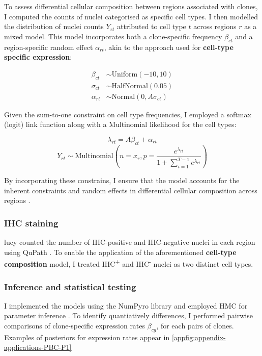 To assess differential cellular composition between regions associated with clones, I computed the counts of nuclei categorised as specific cell types. I then modelled the distribution of nuclei counts $Y_{rt}$ attributed to cell type $t$ across regions $r$ as a mixed model. This model incorporates both a clone-specific frequency $\beta_{ct}$ and a region-specific random effect $\alpha_{rt}$, akin to the approach used for \textbf{cell-type specific expression}:

\begin{align}
\beta_{ct} &\sim \text{Uniform}(-10, 10) \\
\sigma_{ct} &\sim \text{HalfNormal}(0.05) \\
\alpha_{rt} &\sim \text{Normal}(0, A\sigma_{ct})
\end{align}

Given the sum-to-one constraint on cell type frequencies, I employed a softmax (logit) link function along with a Multinomial likelihood for the cell types:

\begin{equation}
\lambda_{rt} = A\beta_{ct} + \alpha_{rt}
\end{equation}
\begin{equation}
Y_{rt} \sim \text{Multinomial}\left(n=x_r, p=\frac{e^{\lambda_{rt}}}{1 + \sum_{i=1}^{T-1} e^{\lambda_{rt}}}\right)
\end{equation}

By incorporating these constrains, I ensure that the model accounts for the inherent constraints and random effects in differential cellular composition across regions .

\subsubsection*{IHC staining}
\ac{lucy} counted the number of IHC-positive and IHC-negative nuclei in each region using QuPath \parencite{Bankhead2017-px}. To enable the application of the aforementioned \textbf{cell-type composition} model, I treated IHC\textsuperscript{+} and IHC\textsuperscript{-} nuclei as two distinct cell types.

\subsubsection*{Inference and statistical testing}

I implemented the models using the \ac{NumPyro} library and employed \acf{HMC} for parameter inference . To identify quantiatively differences, I performed pairwise comparisons of clone-specific expression rates $\beta_{cg}$, for each pairs of clones. Examples of posteriors for expression rates appear in \cref{appfig:appendix-applications-PBC-P1}

